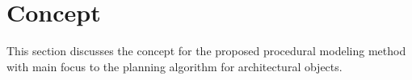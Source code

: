 
\chapter{Concept}
\label{sec:concept}


This section discusses the concept for the proposed procedural modeling method with main focus to the planning algorithm for architectural objects. 




%






